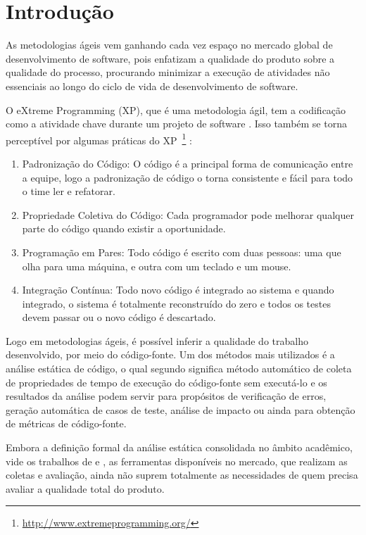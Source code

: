 \chapter{Introdução}

As metodologias ágeis vem ganhando cada vez espaço no mercado global 
de desenvolvimento de software, pois enfatizam a qualidade do produto 
sobre a qualidade do processo, procurando minimizar a execução 
de atividades não essenciais ao longo do ciclo de vida de 
desenvolvimento de software. 

O eXtreme Programming (XP), que é uma metodologia ágil, tem a codificação como a 
atividade chave durante um projeto de software \cite{beck1999}. Isso também se 
torna perceptível por algumas práticas do 
XP~\footnote{\url{http://www.extremeprogramming.org/}} :

\begin{enumerate}
\item Padronização do Código: O código é a principal forma de comunicação entre 
a equipe, logo a padronização de código o torna consistente e fácil para todo o 
time ler e refatorar. 
\item Propriedade Coletiva do Código: Cada programador pode melhorar qualquer 
parte do código quando existir a oportunidade.
\item Programação em Pares: Todo código é escrito com duas pessoas: uma que olha 
para uma máquina, e outra com um teclado e um mouse.
\item Integração Contínua: Todo novo código é integrado ao sistema e quando 
integrado, o sistema é totalmente reconstruído do zero e todos os testes devem 
passar ou o novo código é descartado.

\end{enumerate} 


Logo em metodologias ágeis, é possível inferir a qualidade do trabalho 
desenvolvido, por meio do código-fonte. Um dos métodos mais utilizados é a 
análise estática de código, o qual segundo  
significa método automático de coleta de propriedades de tempo de execução do 
código-fonte sem executá-lo e os resultados da análise podem servir para 
propósitos de verificação de erros, geração automática de casos de teste, 
análise de impacto ou ainda para obtenção de métricas de código-fonte.

Embora a definição formal da análise estática consolidada no âmbito acadêmico, 
vide os trabalhos de \cite{Wichmann95} e \cite{Nielson:1999}, as ferramentas 
disponíveis no mercado, que realizam as coletas e avaliação, 
ainda não suprem totalmente as necessidades de quem precisa avaliar a 
qualidade total do produto.

